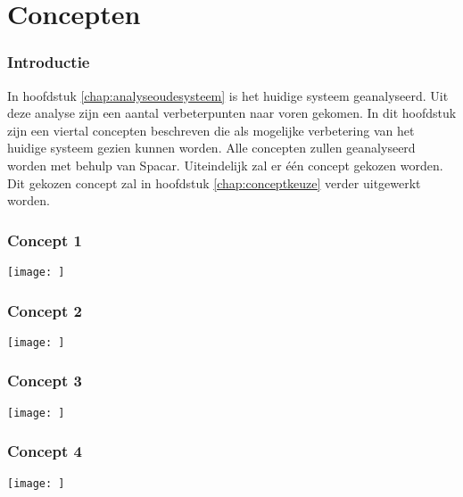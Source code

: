 \chapter{Concepten}
\subsection{Introductie}
In hoofdstuk \ref{chap:analyseoudesysteem} is het huidige systeem geanalyseerd. Uit deze analyse zijn een aantal verbeterpunten naar voren gekomen. In dit hoofdstuk zijn een viertal concepten beschreven die als mogelijke verbetering van het huidige systeem gezien kunnen worden. Alle concepten zullen geanalyseerd worden met behulp van Spacar. Uiteindelijk zal er \'e\'en concept gekozen worden. Dit gekozen concept zal in hoofdstuk \ref{chap:conceptkeuze}  verder uitgewerkt worden.

\subsection{Concept 1}
\texttt{[image: ]}

\subsection{Concept 2}
\texttt{[image: ]}

\subsection{Concept 3}
\texttt{[image: ]}

\subsection{Concept 4}
\texttt{[image: ]}